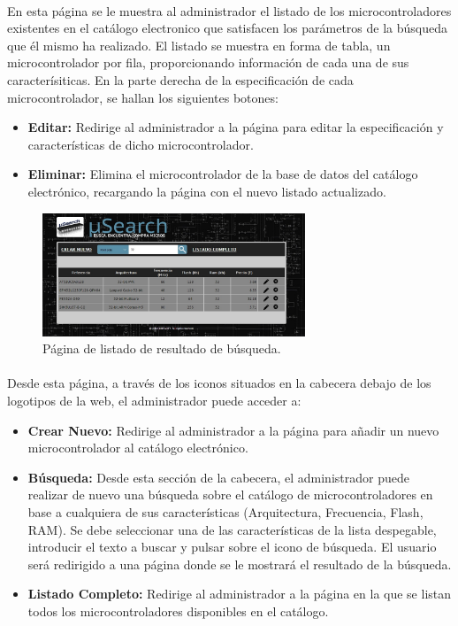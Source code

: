 \paragraph{}En esta página se le muestra al administrador el listado de los microcontroladores existentes en el catálogo electronico que satisfacen los parámetros de la búsqueda que él mismo ha realizado. El listado se muestra en forma de tabla, un microcontrolador por fila, proporcionando información de cada una de sus caracterísiticas. En la parte derecha de la especificación de cada microcontrolador, se hallan los siguientes botones:
\begin{itemize}
	\item \textbf{Editar:} Redirige al administrador a la página para editar la especificación y características de dicho microcontrolador.
	\item \textbf{Eliminar:} Elimina el microcontrolador de la base de datos del catálogo electrónico, recargando la página con el nuevo listado actualizado.
\end{itemize}

\begin{figure}[h!]
	\centering
	\includegraphics[width=0.70\textwidth]{img/listado_busqueda_admin}
	\caption{Página de listado de resultado de búsqueda.}
	\label{fig:listado_busqueda_admin}
\end{figure}

\paragraph{}Desde esta página, a través de los iconos situados en la cabecera debajo de los logotipos de la web, el administrador puede acceder a:

\begin{itemize}
	\item \textbf{Crear Nuevo:} Redirige al administrador a la página para añadir un nuevo microcontrolador al catálogo electrónico.

	\item \textbf{Búsqueda:} Desde esta sección de la cabecera, el administrador puede realizar de nuevo una búsqueda sobre el catálogo de microcontroladores en base a cualquiera de sus características (Arquitectura, Frecuencia, Flash, RAM). Se debe seleccionar una de las características de la lista despegable, introducir el texto a buscar y pulsar sobre el icono de búsqueda.
	El usuario será redirigido a una página donde se le mostrará el resultado de la búsqueda.
			
	\item \textbf{Listado Completo:} Redirige al administrador a la página en la que se listan todos los microcontroladores disponibles en el catálogo.
\end{itemize}